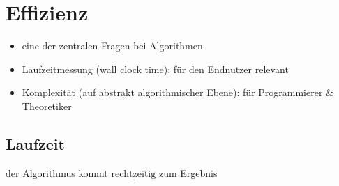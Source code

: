 
    \chapter{Effizienz}

    \begin{itemize}
        \item eine der zentralen Fragen bei Algorithmen
        \item Laufzeitmessung (\glqq wall clock time\grqq ): für den Endnutzer relevant
        \item Komplexität (auf abstrakt algorithmischer Ebene): für Programmierer \& Theoretiker
    \end{itemize}

    \section{Laufzeit}
    \glqq der Algorithmus kommt $\underline{\text{rechtzeitig}}$ zum Ergebnis\grqq
